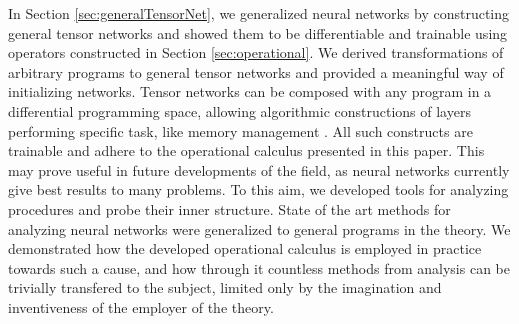\documentclass[preprint,12pt]{elsarticle}
\begin{document}
In Section \ref{sec:generalTensorNet}, we generalized neural networks by constructing general tensor networks and showed them to be differentiable and trainable using operators constructed in Section \ref{sec:operational}. We derived transformations of arbitrary programs to general tensor networks and provided a meaningful way of initializing networks. Tensor networks can be composed with any program in a differential programming space, allowing algorithmic constructions of layers performing specific task, like memory management \cite{LSTM}\cite{netRam}. All such constructs are trainable and adhere to the operational calculus presented in this paper. 
This may prove useful in future developments of the field, as neural networks currently give best results to many problems. To this aim, we developed tools for analyzing procedures and probe their inner structure.
State of the art methods for analyzing neural networks were generalized to general programs in the theory.
We demonstrated how the developed operational calculus is employed in practice towards such a cause, and how through it countless methods from analysis can be trivially transfered to the subject, limited only by the imagination and inventiveness of the employer of the theory.

\clearpage

\nocite{*}

\end{document}
